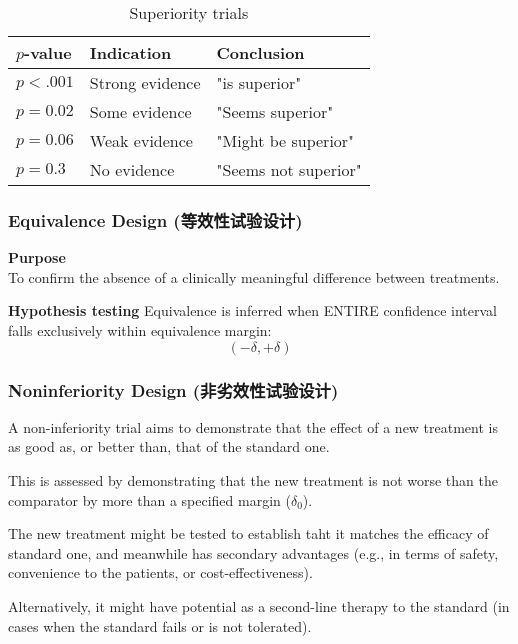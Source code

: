 \documentclass[table,10pt]{beamer}
\begin{document}
\begin{CJK*}{UTF8}{gbsn}
\begin{frame}[t]
\begin{table}
\caption{Superiority trials}
\begin{tabular}{p{}p{}p{}}
\hline
$p$-value & Indication & Conclusion\\
\hline
$p<.001$ & Strong evidence & "is superior"\\
$p=0.02$ & Some evidence & "Seems superior"\\
$p=0.06$ & Weak evidence & "Might be superior"\\
$p=0.3$ & No evidence & "Seems not superior"\\
\hline
\end{tabular}
\end{table}
\end{frame}


\begin{frame}[t]
\frametitle{Equivalence Design (等效性试验设计)}
\textbf{Purpose}\\
To confirm the \alert{absence of a clinically meaningful difference} between 
treatments.

\textbf{Hypothesis testing}
Equivalence is inferred when \alert{ENTIRE confidence interval falls exclusively 
within equivalence margin: }
$$
(-\delta, +\delta)
$$
\end{frame}


\begin{frame}[t]
\frametitle{Noninferiority Design (非劣效性试验设计)}
A non-inferiority trial aims to demonstrate that the effect of a new treatment 
is as good as, or better than, that of the standard one.

This is assessed by demonstrating that the new treatment is \alert{not worse than} 
the comparator by more than a specified margin ($\delta_0$).

The new treatment might be tested to establish taht it matches the efficacy of 
standard one, and meanwhile has secondary advantages (e.g., in terms of safety, 
convenience to the patients, or cost-effectiveness).

Alternatively, it might have potential as a \alert{second-line therapy} to the 
standard (in cases when the standard fails or is not tolerated).
\end{frame}



\end{CJK*}
\end{document}
